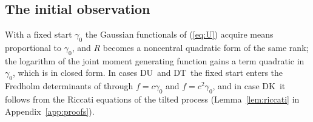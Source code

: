 \documentclass[ecta,nameyear,final]{econsocart}
\newcommand{\Fk}{\textsf{\upshape DK}}
\newcommand{\Fu}{\textsf{\upshape DU}}
\newcommand{\Ft}{\textsf{\upshape DT}}
\theoremstyle{plain}
\theoremstyle{definition}
\begin{document}
\subsection{The initial observation}
\label{sec:init}

With a fixed start $\gamma_0$ the Gaussian functionals of (\ref{eq:U}) acquire means proportional to $\gamma_0$, and $R$ becomes a noncentral quadratic form of the same rank; the logarithm of the joint moment generating function gains a term quadratic in $\gamma_0$, which is in closed form.  In cases \Fu\ and \Ft\ the fixed start enters the Fredholm determinants of \citet[Theorems~1 and 2]{NabeyaSorensen1994} through $f=c\gamma_0$ and $f=c^2\gamma_0$, and in case \Fk\ it follows from the Riccati equations of the tilted process (Lemma~\ref{lem:riccati} in Appendix~\ref{app:proofs}).
\end{document}
